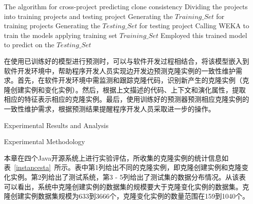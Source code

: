 \vspace{1em}
\begin{minipage}{0.8\textwidth}
\centering
\begin{algorithm}[H]
 {The algorithm for cross-project predicting clone consistency}
\label{alg-crossperdiction}
Dividing the projects into training projects and testing project\;
Generating the $Training\_{Set}$ for training projects\;
Generating the $Testing\_{Set}$ for testing project\;
Calling WEKA to train the models applying training set $Training\_{Set}$\;
Employed this trained model to predict on the $Testing\_{Set}$\;
\end{algorithm}
\end{minipage}
\vspace{1em}

在使用已训练好的模型进行预测时，可以与软件开发过程相结合，将该模型嵌入到软件开发环境中，帮助程序开发人员实现边开发边预测克隆实例的一致性维护需求。首先，在软件开发环境中需监测和跟踪克隆代码，识别新产生的克隆实例（克隆创建实例和变化实例）。然后，根据上文描述的代码、上下文和演化属性，提取相应的特征表示相应的克隆实例。最后，使用训练好的预测器预测相应克隆实例的一致性维护需求，根据预测结果提醒程序开发人员采取进一步的操作。

{Experimental Results and Analysis}

{Experimental Methodology}

本章在四个Java开源系统上进行实验评估，所收集的克隆实例的统计信息如表~\ref{instancesta}~所示。表中第1列给出不同的克隆实例，即克隆创建实例和克隆变化实例。第2列给出了测试系统，第3 - 5列给出了测试集的数据分布情况。从该表可以看出，系统中克隆创建实例的数据集的规模要大于克隆变化实例的数据集。克隆创建实例数据集规模为633到3666个，克隆变化实例的数量范围在159到1040个。

